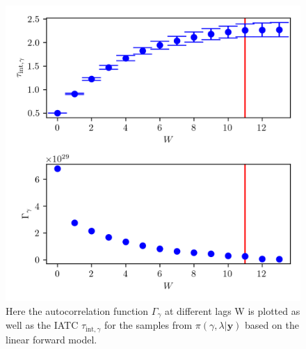 \begin{figure}[ht!]
	\centering
	\includegraphics{UwerrTauIntFirstO3gam.png}
	\caption[IATC of $\gamma$ samples from $\pi(\gamma, \lambda| \bm{y})$, for linear model.]{Here the autocorrelation function $\Gamma_{\gamma}$ at different lags W is plotted as well as the IATC $\tau_{\text{int},\gamma}$ for the samples from $\pi(\gamma, \lambda| \bm{y})$ based on the linear forward model.}
	\label{fig:IATCGamLin}
\end{figure}
\clearpage

